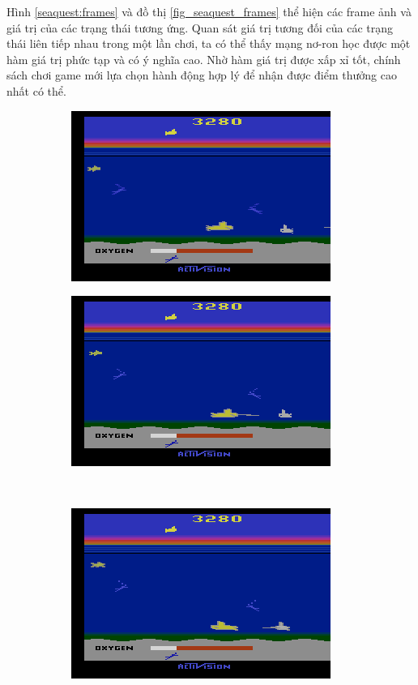	Hình \ref{seaquest:frames} và đồ thị \ref{fig_seaquest_frames} thể hiện các frame ảnh và giá trị của các trạng thái tương ứng.
	Quan sát giá trị tương đối của các trạng thái liên tiếp nhau trong một lần chơi, ta có thể thấy mạng nơ-ron học được một hàm giá trị phức tạp và có ý nghĩa cao.
	Nhờ hàm giá trị được xấp xỉ tốt, chính sách chơi game mới lựa chọn hành động hợp lý để nhận được điểm thưởng cao nhất có thể.
	
	\begin{figure}
		\begin{subfigure}{.5\textwidth}
			\centering
			\includegraphics[width=.8\linewidth]{008182}
			\caption{}
			\label{seaquest:frame_1}
		\end{subfigure}%
		\begin{subfigure}{.5\textwidth}
			\centering
			\includegraphics[width=.8\linewidth]{008185}
			\caption{}
			\label{seaquest:frame_2}
		\end{subfigure}\\[2ex]
		\begin{subfigure}{.5\textwidth}
			\centering
			\includegraphics[width=.8\linewidth]{008188}

\end{subfigure}
\end{figure}
